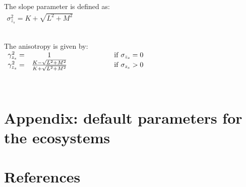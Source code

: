The slope parameter is defined as:\\

$
\begin{array}{ll}
\sigma^2_{z_s} = K + \sqrt{L^2+M^2}&\\
&\\
&\\
\end{array}
$

The anisotropy is given by:\\

$
\begin{array}{lcl}
\gamma^2_{z_s} =& 1                                             & \hspace*{2.cm} {\rm if} \; \sigma_{z_s} = 0 \\
\gamma^2_{z_s} =& \frac{K - \sqrt{L^2+M^2}}{K + \sqrt{L^2+M^2}} & \hspace*{2.cm} {\rm if} \; \sigma_{z_s} > 0 \\
&&\\
&&\\
\end{array}
$

\newpage
\section{Appendix: default parameters for the ecosystems}


\newpage
\section{References}

